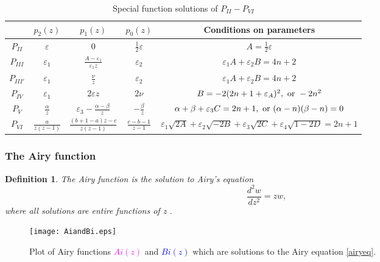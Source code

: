 \documentclass[12pt]{article}
\newtheorem{mydef1}{Definition}[section]
\numberwithin{figure}{section}
\numberwithin{equation}{section}
\numberwithin{table}{section}
\begin{document}
\begin{table}[H]
\centering\caption{Special function solutions of $P_{II}-P_{VI}$} %
\centering  %
\footnotesize\begin{tabular}{|c|c|c|c|c|} %
\hline
& $p_2(z)$ & $p_1(z)$ & $p_0(z)$ & Conditions on parameters\\
\hline
$P_{II}$&$\varepsilon$&$0$&$\tfrac{1}{2}\varepsilon$&$A=\tfrac{1}{2}\varepsilon$\\
$P_{III}$&$\varepsilon_1$&$\frac{A-\varepsilon_1}{\varepsilon_1z}$&$\varepsilon_2$&$\varepsilon_1A+\varepsilon_2B=4n+2$ \\
$P_{III'}$&$\varepsilon_1$&$\tfrac{\nu}{z}$&$\varepsilon_2$&$\varepsilon_1A+\varepsilon_2B=4n+2$\\
$P_{IV}$&$\varepsilon_1$&$2\varepsilon z$&$2\nu$&$B=-2(2n+1+\varepsilon_A)^2,~{\rm{or}}~-2n^2$ \\
$P_{V}$&$\tfrac{\alpha}{z}$&$\varepsilon_3-\tfrac{\alpha-\beta}{z}$&$-\tfrac{\beta}{z}$&$\alpha
+\beta+\varepsilon_3C=2n+1,~{\rm{or}}~(\alpha-n)(\beta-n)=0$ \\
$P_{VI}$&$\tfrac{a}{z(z-1)}$&$\tfrac{(b+1-a)z-c}{z(z-1)}$&$\tfrac{c-b-1}{z-1}$&$\varepsilon_1\sqrt{2A}+
\varepsilon_2\sqrt{-2B}+\varepsilon_3\sqrt{2C}+\varepsilon_4\sqrt{1-2D}=2n+1$ \\
\hline
\end{tabular}
\label{table:nonlin} %
\end{table}

\subsubsection{The Airy function}
\begin{mydef1}
The Airy function is the solution to Airy's equation
\begin{equation}
\frac{d^2w}{dz^2}=zw,\label{airyeq}
\end{equation}
where all solutions are entire functions of z \cite[\S9.2(i)]{DLMF}.
\end{mydef1}
\begin{figure}[H]
\centering
{\texttt{[image: AiandBi.eps]}}
\caption{Plot of Airy functions \textcolor{magenta}{$Ai(z)$} and \textcolor{blue}{$Bi(z)$} which are solutions to the Airy equation \eqref{airyeq}.}
\label{Airyplot}
\end{figure}
\end{document}
